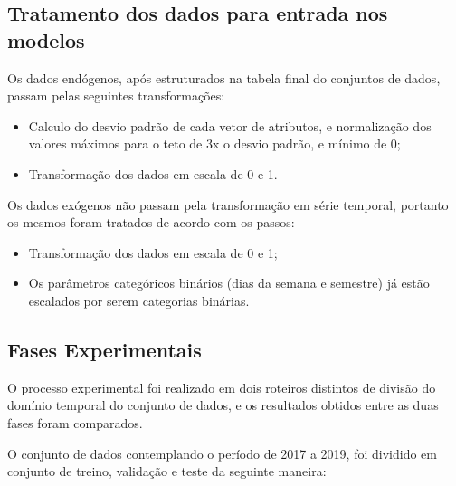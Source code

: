         \subsection{Tratamento dos dados para entrada nos modelos}
         	Os dados endógenos, após estruturados na tabela final do conjuntos de dados, passam pelas seguintes transformações:
         	\begin{itemize}
                \item	Calculo do desvio padrão de cada vetor de atributos, e normalização dos valores máximos para o teto de 3x o desvio padrão, e mínimo de 0; 
                \item	Transformação dos dados em escala de 0 e 1.
            \end{itemize}
            Os dados exógenos não passam pela transformação em série temporal, portanto os mesmos foram tratados de acordo com os passos:
            \begin{itemize}
                \item	Transformação dos dados em escala de 0 e 1;
                \item	Os parâmetros categóricos binários (dias da semana e semestre) já estão escalados por serem categorias binárias.
            \end{itemize}
    	\subsection{Fases Experimentais} \label{subsec:fases_experimentais}
            O processo experimental foi realizado em dois roteiros distintos de divisão do domínio temporal do conjunto de dados, e os resultados obtidos entre as duas fases foram comparados.
            
            O conjunto de dados contemplando o período de 2017 a 2019, foi dividido em conjunto de treino, validação e teste da seguinte maneira: 
            
